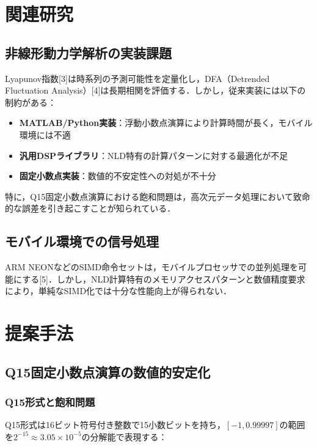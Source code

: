 \documentclass[10pt,twocolumn]{article}
\begin{document}
\begin{CJK}{UTF8}{min}
\section{関連研究}

\subsection{非線形動力学解析の実装課題}

Lyapunov指数[3]は時系列の予測可能性を定量化し，DFA（Detrended Fluctuation Analysis）[4]は長期相関を評価する．しかし，従来実装には以下の制約がある：

\begin{itemize}
\item \textbf{MATLAB/Python実装}：浮動小数点演算により計算時間が長く，モバイル環境には不適
\item \textbf{汎用DSPライブラリ}：NLD特有の計算パターンに対する最適化が不足
\item \textbf{固定小数点実装}：数値的不安定性への対処が不十分
\end{itemize}

特に，Q15固定小数点演算における飽和問題は，高次元データ処理において致命的な誤差を引き起こすことが知られている．

\subsection{モバイル環境での信号処理}

ARM NEONなどのSIMD命令セットは，モバイルプロセッサでの並列処理を可能にする[5]．しかし，NLD計算特有のメモリアクセスパターンと数値精度要求により，単純なSIMD化では十分な性能向上が得られない．

\section{提案手法}

\subsection{Q15固定小数点演算の数値的安定化}

\subsubsection{Q15形式と飽和問題}
Q15形式は16ビット符号付き整数で15小数ビットを持ち，$[-1, 0.99997]$の範囲を$2^{-15} \approx 3.05 \times 10^{-5}$の分解能で表現する：


\end{CJK}
\end{document}
